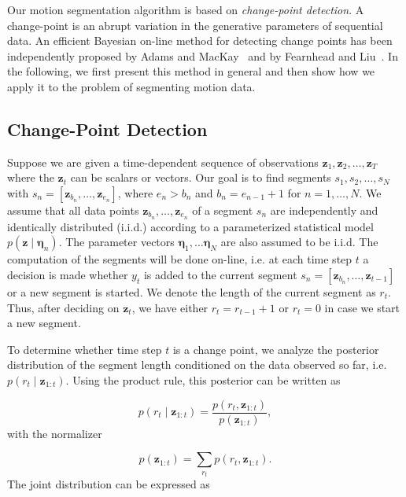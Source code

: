 Our motion segmentation algorithm is based on \emph{change-point
  detection}. A change-point is an abrupt variation in the generative
parameters of sequential data. An efficient Bayesian on-line method for
detecting change points has been independently proposed by Adams and
MacKay~\cite{adams07bayesian} and by Fearnhead and
Liu~\cite{fearnhead07online}. In the following, we first present this
method in general and then show how we apply it to the problem of
segmenting motion data.

\subsection{Change-Point Detection}
Suppose we are given a time-dependent sequence of observations $\mathbf{z}_1,
\mathbf{z}_2, \dots,\mathbf{z}_T$ where the $\mathbf{z}_t$ can be scalars or vectors. Our goal is to find
segments $s_1,s_2,\dots,s_N$ with $s_n=[\mathbf{z}_{b_n},\dots,\mathbf{z}_{e_n}]$, where
$e_n > b_n$ and $b_n = e_{n-1}+1$ for $n=1,\dots,N$. We assume that all data
points $\mathbf{z}_{b_n},\dots,\mathbf{z}_{e_n}$ of a segment $s_n$ are independently and
identically distributed (i.i.d.) according to a parameterized
statistical model \mbox{$p(\mathbf{z}\mid \boldsymbol{\eta}_n)$}. The parameter vectors
$\boldsymbol{\eta}_1,\dots \boldsymbol{\eta}_N$ are also assumed to be
i.i.d.  The computation of the segments will be done on-line, i.e. at
each time step $t$ a decision is made whether $y_t$ is added to the
current segment $s_n=[\mathbf{z}_{b_n},\dots,\mathbf{z}_{t-1}]$ or a new segment is
started. We denote the length of the current segment as $r_t$. Thus,
after deciding on $\mathbf{z}_t$, we have either $r_t=r_{t-1}+1$ or $r_t=0$ in
case we start a new segment.

To determine whether time step $t$ is a change point, we analyze the
posterior distribution of the segment length conditioned on the data
observed so far, i.e.  $p(r_t\mid \mathbf{z}_{1:t})$. Using the product rule, this
posterior can be written as


\begin{equation}
\label{eqn:posterior}
p(r_t\mid \mathbf{z}_{1:t}) = \frac{p(r_t,\mathbf{z}_{1:t})}{p(\mathbf{z}_{1:t})},
\end{equation}
with the normalizer

\begin{equation}
\label{eqn:normalizer}
p(\mathbf{z}_{1:t}) = \sum_{r_t}p(r_t,\mathbf{z}_{1:t}).
\end{equation}
The joint distribution can be expressed as

